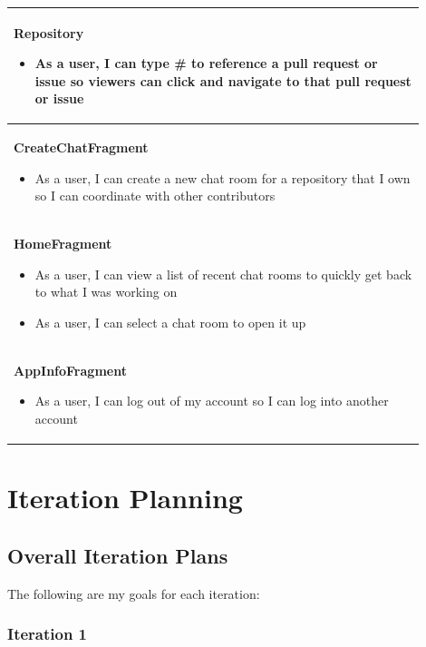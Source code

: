 \documentclass{report}
\begin{document}
\begin{center}
\begin{tabular}{ | p{0.9\linewidth} |}
    \hline
    \textbf{Repository} \begin{itemize}
                            \item As a user, I can type \# to reference a pull request or issue so viewers can click and navigate to that pull request or issue
                        \end{itemize} \\
    \hline
    \textbf{CreateChatFragment} \begin{itemize}
                                    \item As a user, I can create a new chat room for a repository that I own so I can coordinate with other contributors
                                \end{itemize}       \\
    \hline
    \textbf{HomeFragment} \begin{itemize}
                              \item As a user, I can view a list of recent chat rooms to quickly get back to what I was working on
                              \item As a user, I can select a chat room to open it up
                          \end{itemize}                              \\
    \hline
    \textbf{AppInfoFragment} \begin{itemize}
            \item As a user, I can log out of my account so I can log into another account
    \end{itemize} \\
    \hline
    \end{tabular}
\end{center}
\newpage

\chapter{Iteration Planning}

\section{Overall Iteration Plans}

The following are my goals for each iteration:

\subsection{Iteration 1}
\end{document}
